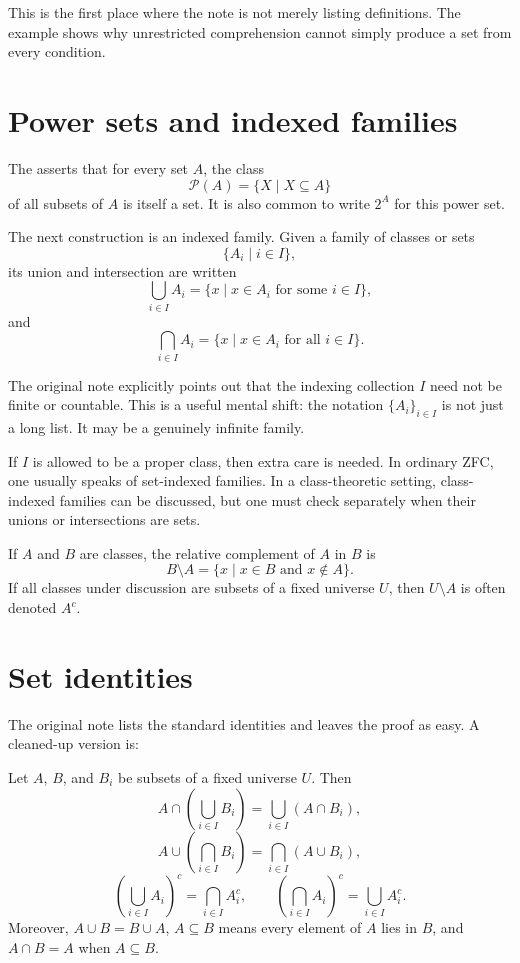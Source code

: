 This is the first place where the note is not merely listing definitions.  The example shows why unrestricted comprehension cannot simply produce a set from every condition.

\section{Power sets and indexed families}

\begin{definition}
The  asserts that for every set \(A\), the class
\[
  \mathcal P(A)=\{X \mid X\subseteq A\}
\]
of all subsets of \(A\) is itself a set.  It is also common to write \(2^A\) for this power set.
\end{definition}

The next construction is an indexed family.  Given a family of classes or sets
\[
  \{A_i \mid i\in I\},
\]
its union and intersection are written
\[
  \bigcup_{i\in I} A_i = \{x \mid x\in A_i \text{ for some } i\in I\},
\]
and
\[
  \bigcap_{i\in I} A_i = \{x \mid x\in A_i \text{ for all } i\in I\}.
\]

\begin{remark}
The original note explicitly points out that the indexing collection \(I\) need not be finite or countable.  This is a useful mental shift: the notation \(\{A_i\}_{i\in I}\) is not just a long list.  It may be a genuinely infinite family.
\end{remark}

\begin{caution}
If \(I\) is allowed to be a proper class, then extra care is needed.  In ordinary ZFC, one usually speaks of set-indexed families.  In a class-theoretic setting, class-indexed families can be discussed, but one must check separately when their unions or intersections are sets.
\end{caution}

If \(A\) and \(B\) are classes, the relative complement of \(A\) in \(B\) is
\[
  B\setminus A = \{x\mid x\in B \text{ and } x\notin A\}.
\]
If all classes under discussion are subsets of a fixed universe \(U\), then \(U\setminus A\) is often denoted \(A^c\).

\section{Set identities}

The original note lists the standard identities and leaves the proof as easy.  A cleaned-up version is:
\begin{proposition}
Let \(A\), \(B\), and \(B_i\) be subsets of a fixed universe \(U\).  Then
\[
 A\cap\left(\bigcup_{i\in I} B_i\right)
 = \bigcup_{i\in I}(A\cap B_i),
\]
\[
 A\cup\left(\bigcap_{i\in I} B_i\right)
 = \bigcap_{i\in I}(A\cup B_i),
\]
\[
 \left(\bigcup_{i\in I} A_i\right)^c
 = \bigcap_{i\in I} A_i^c,
 \qquad
 \left(\bigcap_{i\in I} A_i\right)^c
 = \bigcup_{i\in I} A_i^c.
\]
Moreover, \(A\cup B=B\cup A\), \(A\subseteq B\) means every element of \(A\) lies in \(B\), and \(A\cap B=A\) when \(A\subseteq B\).
\end{proposition}

